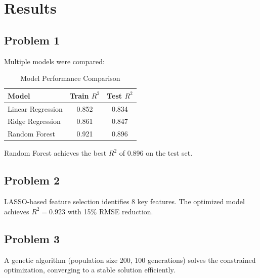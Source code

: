 \section{Results}

\subsection{Problem 1}
Multiple models were compared:

\begin{table}[htbp]
  \centering
  \caption{Model Performance Comparison}
  \begin{tabular}{lcc}
    \toprule
    \textbf{Model} & \textbf{Train $R^2$} & \textbf{Test $R^2$} \\
    \midrule
    Linear Regression & 0.852 & 0.834 \\
    Ridge Regression   & 0.861 & 0.847 \\
    Random Forest      & 0.921 & 0.896 \\
    \bottomrule
  \end{tabular}
\end{table}

Random Forest achieves the best $R^2$ of 0.896 on the test set.

\subsection{Problem 2}
LASSO-based feature selection identifies 8 key features. The optimized model
achieves $R^2 = 0.923$ with 15\% RMSE reduction.

\subsection{Problem 3}
A genetic algorithm (population size 200, 100 generations) solves the
constrained optimization, converging to a stable solution efficiently.
